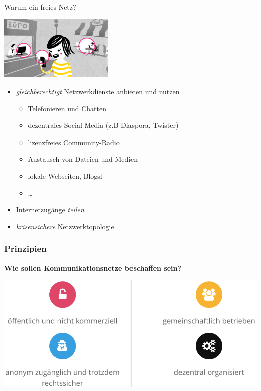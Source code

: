 \documentclass[10pt]{beamer}
\begin{document}
\begin{frame}{Warum ein freies Netz?}
	\vfill
	\begin{center}
		\includegraphics[width=5.5cm]{images/verbindet}
	\end{center}
	
	\begin{itemize}[<+->]
		\item \emph{gleichberechtigt} Netzwerkdienste anbieten und nutzen
		\begin{itemize}
			\item Telefonieren und Chatten
			\item dezentrales Social-Media (z.B Diaspora, Twister)
			\item lizenzfreies Community-Radio
			\item Austausch von Dateien und Medien
			\item lokale Webseiten, Blogsl
			\item \ldots
		\end{itemize}
		\item Internetzugänge \emph{teilen}
		\item \emph{krisensichere} Netzwerktopologie
	\end{itemize}
	\vfill
\end{frame}

\begin{frame}
	\frametitle{Prinzipien}
	\begin{centering}
	\large{\textbf{Wie sollen Kommunikationsnetze beschaffen sein?}}
	\end{centering}
	\pause
	\vfill
	\includegraphics[width=1.1\textheight]{images/principles}$\;$

\end{frame}
\end{document}
